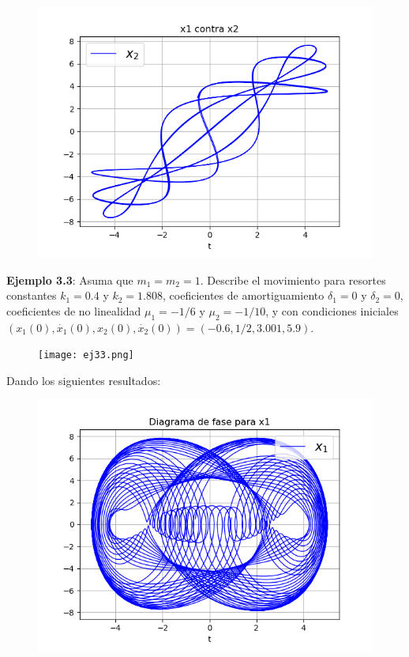 \documentclass{article}
\begin{document}
\begin{figure}[H]
	\centering
    \includegraphics[width=\linewidth]{32_v.png}
\end{figure}
\textbf{Ejemplo 3.3}: Asuma que $m_{1}=m_{2}=1$. Describe el movimiento para resortes constantes $k_{1}=0.4$ y $k_{2}=1.808$, coeficientes de amortiguamiento $\delta_{1}=0$ y $\delta_{2}=0$, coeficientes de no linealidad $\mu_{1}=-1/6$ y $\mu_{2}=-1/10$, y con condiciones iniciales $(x_{1}(0),\dot{x_{1}}(0),x_{2}(0),\dot{x_{2}}(0))=(-0.6,1/2,3.001,5.9)$.\\
\begin{figure}[H]
	\centering
    \texttt{[image: ej33.png]}
\end{figure}
Dando los siguientes resultados:\\
\begin{figure}[H]
	\centering
    \includegraphics[width=\linewidth]{33_f1.png}
\end{figure}
\end{document}

